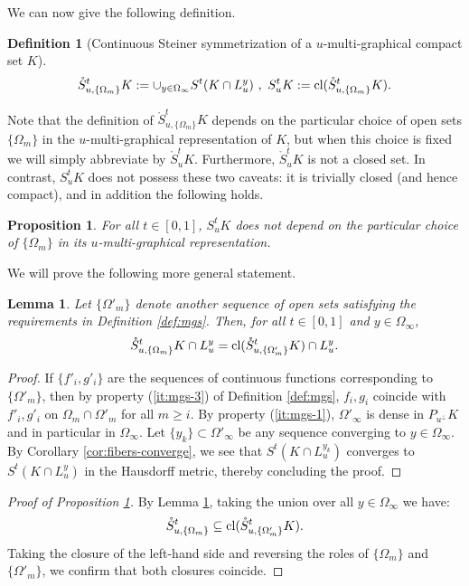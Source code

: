 \documentclass[11pt]{article}
\newtheorem{lem}[thm]{Lemma}
\newtheorem{prop}[thm]{Proposition}
\newtheorem{defn}[thm]{Definition}
\theoremstyle{definition}
\theoremstyle{proof}
\DeclareMathOperator{\+}{\mathop{\tilde{+}}}
\DeclareMathOperator{\closure}{\textnormal{cl}}
\numberwithin{equation}{section}
\numberwithin{equation}{section}
\begin{document}
We can now give the following definition.\begin{defn}[Continuous Steiner symmetrization of a $u$-multi-graphical compact set $K$] \label{def:SutK-general}
\[
\mathring S^t_{u,\{\Omega_m\}} K := \cup_{y \in \Omega_\infty} S^t (K \cap L^y_u)  ~,~ S_u^t K  := \closure(\mathring S_{u,\{\Omega_m\}}^t K) .
\]
\end{defn}
Note that the definition of $\mathring S^t_{u,\{\Omega_m\}} K$ depends on the particular choice of open sets $\{\Omega_m\}$ in the $u$-multi-graphical representation of $K$, but when this choice is fixed we will simply abbreviate by $\mathring S^t_u K$. Furthermore, $\mathring S^t_u K$ is not a closed set. In contrast, $S_u^t K$ does not possess these two caveats: it is trivially closed (and hence compact), and in addition
the following holds.
\begin{prop} \label{prop:independent}
For all $t \in [0,1]$, $S_u^t K$ does not depend on the particular choice of $\{ \Omega_m \}$ in its $u$-multi-graphical representation. 
\end{prop}
We will prove the following more general statement.
\begin{lem} \label{lem:closure}
Let $\{\Omega'_m\}$ denote another sequence of open sets satisfying the requirements in Definition \ref{def:mgs}. 
Then, for all $t \in [0,1]$ and $y \in \Omega_\infty$,
\[
\mathring S^t_{u,\{\Omega_m\}} K \cap L_u^y = \closure(\mathring S^t_{u , \{\Omega'_m\}} K) \cap L_u^y .
\]
\end{lem}
\begin{proof}
If $\{ f'_i, g'_i \}$ are the sequences of continuous functions corresponding to $\{\Omega'_m\}$, then by property (\ref{it:mgs-3}) of Definition \ref{def:mgs}, $f_i,g_i$ coincide with $f'_i,g'_i$ on $\Omega_m \cap \Omega'_m$ for all $m \geq i$. 
By property (\ref{it:mgs-1}), $\Omega'_\infty$ is dense in $P_{u^\perp} K$ and in particular in $\Omega_\infty$. Let $\{y_k\} \subset \Omega'_\infty$ be any sequence converging to $y \in \Omega_\infty$. By Corollary \ref{cor:fibers-converge}, we see that $S^t (K \cap L^{y_k}_u)$ converges to $S^t(K \cap L^y_u)$ in the Hausdorff metric, thereby concluding the proof. 
\end{proof}
\begin{proof}[Proof of Proposition \ref{prop:independent}]
By Lemma \ref{lem:closure}, taking the union over all $y \in \Omega_\infty$ we have:
\[
\mathring S^t_{u,\{\Omega_m\}}  \subseteq \closure(\mathring S^t_{u , \{\Omega'_m\}} K) .
\]
Taking the closure of the left-hand side and reversing the roles of $\{\Omega_m\}$ and $\{\Omega'_m\}$, we confirm that both closures coincide. 
\end{proof}
\end{document}
